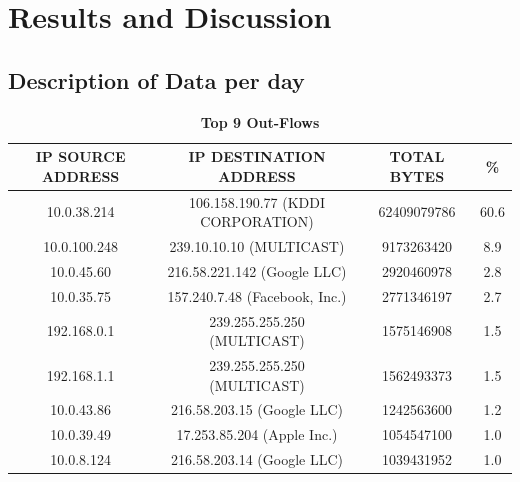 \documentclass[journal]{IEEE/IEEEtran}
\begin{document}
\section{Results and Discussion}

\subsection{Description of Data per day}

\begin{table}[ht]
\centering
\caption{\textbf{Top 9 Out-Flows}}
\label{top-out-flows}
\begin{tabular}{|c|c|c|c|}
\hline
\textbf{IP SOURCE ADDRESS} & \textbf{IP DESTINATION ADDRESS} 	& \textbf{TOTAL BYTES} 	& \textbf{\%} \\ \hline
    10.0.38.214		       & 106.158.190.77 (KDDI CORPORATION)  &  62409079786			& 60.6        \\ \hline
    10.0.100.248           & 239.10.10.10 (MULTICAST)			&  9173263420           & 8.9         \\ \hline
    10.0.45.60      	   & 216.58.221.142 (Google LLC)		&  2920460978           & 2.8         \\ \hline
    10.0.35.75             & 157.240.7.48 (Facebook, Inc.)		&  2771346197           & 2.7         \\ \hline
    192.168.0.1            & 239.255.255.250 (MULTICAST)		&  1575146908           & 1.5         \\ \hline
    192.168.1.1            & 239.255.255.250 (MULTICAST)		&  1562493373           & 1.5         \\ \hline
    10.0.43.86             & 216.58.203.15 (Google LLC)			&  1242563600           & 1.2         \\ \hline
    10.0.39.49		   	   & 17.253.85.204 (Apple Inc.)			&  1054547100           & 1.0         \\ \hline
    10.0.8.124	           & 216.58.203.14 (Google LLC)			&  1039431952           & 1.0         \\ \hline
\end{tabular}
\end{table}
\end{document}
